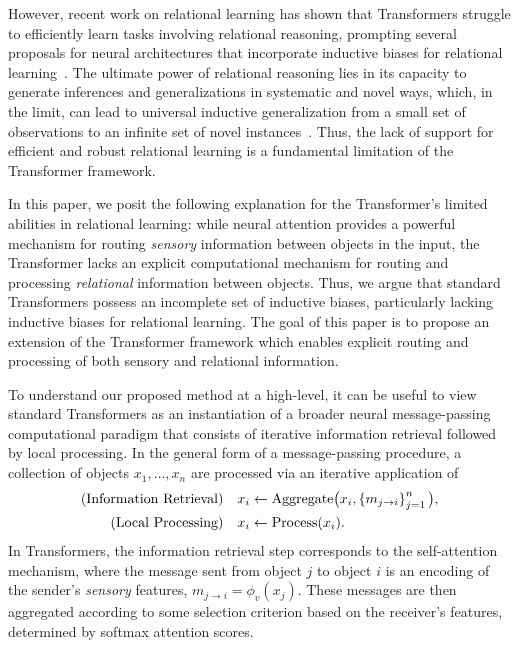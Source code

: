 However, recent work on relational learning has shown that Transformers struggle to efficiently learn tasks involving relational reasoning, prompting several proposals for neural architectures that incorporate inductive biases for relational learning~\citep{santoroSimpleNeuralNetwork2017,santoroRelationalRecurrentNeural2018,shanahanExplicitlyRelationalNeurala,webbEmergentSymbolsBinding2021,webbRelationalBottleneckInductive2024,kergNeuralArchitectureInductive2022,altabaa2024abstractors,altabaaLearningHierarchicalRelational2024}. The ultimate power of relational reasoning lies in its capacity to generate inferences and generalizations in systematic and novel ways, which, in the limit, can lead to universal inductive generalization from a small set of observations to an infinite set of novel instances~\citep{goyal2022inductive}. Thus, the lack of support for efficient and robust relational learning is a fundamental limitation of the Transformer framework.

In this paper, we posit the following explanation for the Transformer's limited abilities in relational learning: while neural attention provides a powerful mechanism for routing \textit{sensory} information between objects in the input, the Transformer lacks an explicit computational mechanism for routing and processing \textit{relational} information between objects. Thus, we argue that standard Transformers possess an incomplete set of inductive biases, particularly lacking inductive biases for relational learning. The goal of this paper is to propose an extension of the Transformer framework which enables explicit routing and processing of both sensory and relational information.

To understand our proposed method at a high-level, it can be useful to view standard Transformers as an instantiation of a broader neural message-passing computational paradigm that consists of iterative information retrieval followed by local processing. In the general form of a message-passing procedure, a collection of objects $x_1,\ldots, x_n$ are processed via an iterative application of
\begin{equation}\label{eq:intro_message_passing}
  \begin{split}
    \text{(Information Retrieval)} \quad x_i &\gets \mathrm{Aggregate}\big(x_i, \left\{m_{j \to i}\right\}_{j=1}^{n}\big), \\
    \text{(Local Processing)} \quad x_i &\gets \mathrm{Process}(x_i).
  \end{split}
\end{equation}
In Transformers, the information retrieval step corresponds to the self-attention mechanism, where the message sent from object $j$ to object $i$ is an encoding of the sender's \textit{sensory} features, $m_{j \to i} = \phi_v(x_j)$. These messages are then aggregated according to some selection criterion based on the receiver's features, determined by softmax attention scores.

